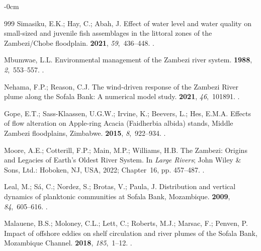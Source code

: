 \documentclass[coasts,article,accept,pdftex,oneauthor]{Definitions/mdpi}
\begin{document}
\begin{adjustwidth}{-\extralength}{0cm}
\begin{thebibliography}{999}
Simasiku, E.K.; Hay, C.; Abah, J.
\newblock Effect of water level and water quality on small-sized and juvenile
  fish assemblages in the littoral zones of the Zambezi/Chobe floodplain.
 {\bf 2021}, {\em 59},~436--448.
.

Mbumwae, L.L.
\newblock Environmental management of the Zambezi river system.
 {\bf 1988}, {\em
  2},~553--557.
.

Nehama, F.P.; Reason, C.J.
\newblock The wind-driven response of the Zambezi River plume along the Sofala
  Bank: A numerical model study.
 {\bf 2021}, {\em
  46},~101891.
.

Gope, E.T.; Sass-Klaassen, U.G.W.; Irvine, K.; Beevers, L.; Hes, E.M.A.
\newblock Effects of flow alteration on Apple-ring Acacia (Faidherbia albida)
  stands, Middle Zambezi floodplains, Zimbabwe.
 {\bf 2015}, {\em 8},~922--934.
.

Moore, A.E.; Cotterill, F.P.; Main, M.P.; Williams, H.B. The Zambezi: Origins
  and Legacies of Earth's Oldest River System.
\newblock In {\em Large Rivers}; John Wiley \& Sons, Ltd.: Hoboken, NJ, USA, 2022; Chapter~16, %
  pp. 457--487.
.

Leal, M.; Sá, C.; Nordez, S.; Brotas, V.; Paula, J.
\newblock Distribution and vertical dynamics of planktonic communities at
  Sofala Bank, Mozambique.
 {\bf 2009}, {\em
  84},~605--616.
.

Malauene, B.S.; Moloney, C.L.; Lett, C.; Roberts, M.J.; Marsac, F.; Penven, P.
\newblock Impact of offshore eddies on shelf circulation and river plumes of
  the Sofala Bank, Mozambique Channel.
 {\bf 2018}, {\em 185},~1--12.
.


\end{thebibliography}
\end{adjustwidth}
\end{document}
